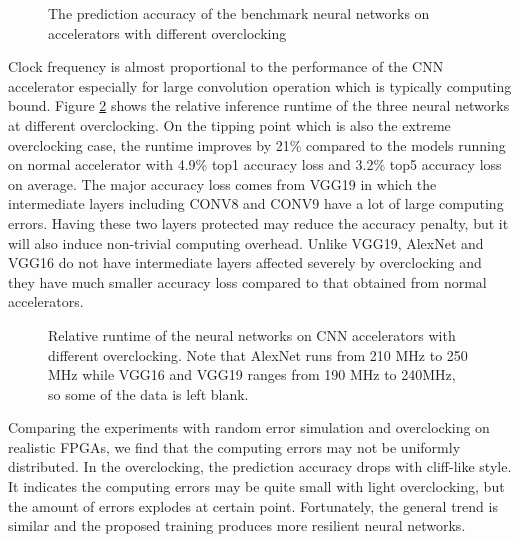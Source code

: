 \begin{figure}
        \center
	\qquad
        \qquad
	\caption{The prediction accuracy of the benchmark neural networks on accelerators with different overclocking}
        \label{fig:overclock-accuracy}
		\vspace{-1em}
\end{figure}

Clock frequency is almost proportional to the performance of the CNN accelerator 
especially for large convolution operation which is typically computing bound. 
Figure \ref{fig:overclocking-time} shows the relative inference runtime of the three neural networks at different 
overclocking. On the tipping point which is also the extreme overclocking case, 
the runtime improves by 21\% compared to the models running on normal accelerator with 
4.9\% top1 accuracy loss and 3.2\% top5 accuracy loss on average. 
The major accuracy loss comes from VGG19 in which the intermediate layers 
including CONV8 and CONV9 have a lot of large computing errors. 
Having these two layers protected may reduce the accuracy penalty, but it will also induce 
non-trivial computing overhead. Unlike VGG19, AlexNet and VGG16 do not have intermediate layers affected 
severely by overclocking and they have much smaller accuracy loss compared to that obtained from 
normal accelerators.

\begin{figure}
        \caption{Relative runtime of the neural networks on CNN accelerators with different overclocking. Note that AlexNet runs from 210 MHz to 250 MHz while 
		VGG16 and VGG19 ranges from 190 MHz to 240MHz, so some of the data is left blank.}
        \label{fig:overclocking-time}
\end{figure}

Comparing the experiments with random error simulation and overclocking on realistic FPGAs, we
find that the computing errors may not be uniformly distributed. In the overclocking,  
the prediction accuracy drops with cliff-like style. It indicates the computing errors may 
be quite small with light overclocking, but the amount of errors explodes at certain point.
Fortunately, the general trend is similar and the proposed training produces more resilient 
neural networks. 


